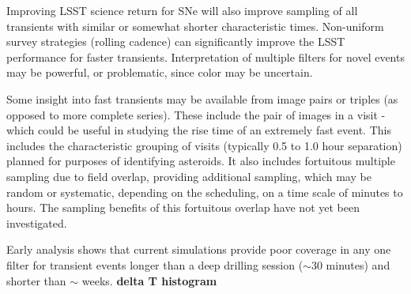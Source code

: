 Improving LSST science return for SNe will also improve sampling of
all transients with similar or somewhat shorter characteristic times.
Non-uniform survey strategies (rolling cadence) can significantly
improve the LSST performance for faster transients.  Interpretation of
multiple filters for novel events may be powerful, or problematic,
since color may be uncertain.

Some insight into fast transients may be available from image pairs or
triples (as opposed to more complete series).  These include the pair
of images in a visit - which could be useful in studying the rise time
of an extremely fast event.  This includes the characteristic grouping
of visits (typically 0.5 to 1.0 hour separation) planned for purposes
of identifying asteroids.  It also includes fortuitous multiple
sampling due to field overlap, providing additional sampling, which
may be random or systematic, depending on the scheduling, on a time
scale of minutes to hours.  The sampling benefits of this fortuitous
overlap have not yet been investigated.

Early analysis shows that current simulations provide  poor coverage in any
one filter for transient events longer than a deep drilling session
($\sim$30 minutes) and shorter than $\sim$ weeks.
\textbf{delta T histogram}



% 








% 


% 


% 






